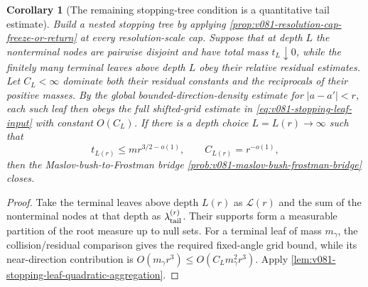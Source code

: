 \documentclass[10pt]{article}
\newtheorem{corollary}[theorem]{Corollary}
\begin{document}
\begin{corollary}[The remaining stopping-tree condition is a quantitative tail estimate]
\label{cor:v081-stopping-tree-tail-criterion}
Build a nested stopping tree by applying
\cref{prop:v081-resolution-cap-freeze-or-return} at every resolution-scale cap.  Suppose that at
depth \(L\) the nonterminal nodes are pairwise disjoint and have total mass \(t_L\downarrow0\),
while the finitely many terminal leaves above depth \(L\) obey their relative residual estimates.
Let \(C_L<\infty\) dominate both their residual constants and the reciprocals of their positive
masses.  By the global bounded-direction-density estimate for \(|a-a'|<r\), each such leaf then
obeys the full shifted-grid estimate in
\eqref{eq:v081-stopping-leaf-input} with constant \(O(C_L)\).  If there is a depth choice
\(L=L(r)\to\infty\) such that
\begin{equation}
\label{eq:v081-stopping-tree-tail-target}
\boxed{
t_{L(r)}
\le
mr^{3/2-o(1)},
\qquad
C_{L(r)}
=
r^{-o(1)},
}
\end{equation}
then the Maslov-bush-to-Frostman bridge
\cref{prob:v081-maslov-bush-frostman-bridge} closes.
\end{corollary}

\begin{proof}
Take the terminal leaves above depth \(L(r)\) as
\(\mathcal L(r)\) and the sum of the nonterminal nodes at that depth as
\(\lambda_{\rm tail}^{(r)}\).  Their supports form a measurable partition of the root measure up
to null sets.  For a terminal leaf of mass \(m_\gamma\), the collision/residual comparison gives
the required fixed-angle grid bound, while its near-direction contribution is
\(O(m_\gamma r^3)\le O(C_Lm_\gamma^2r^3)\).  Apply
\cref{lem:v081-stopping-leaf-quadratic-aggregation}.
\end{proof}
\end{document}
